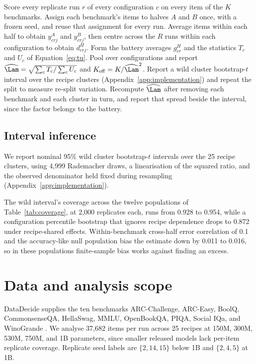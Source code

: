 \begin{algorithm}[t]
\caption{SNAP measurement recipe for a fixed battery of $K$ benchmarks scored on $R$ replicate runs per configuration.}
\label{alg:snap}
\begin{algorithmic}[1]
\STATE Score every replicate run $r$ of every configuration $c$ on every item of the $K$ benchmarks.
\STATE Assign each benchmark's items to halves $A$ and $B$ once, with a frozen seed, and reuse that assignment for every run.
\STATE Average items within each half to obtain $y^A_{crj}$ and $y^B_{crj}$, then centre across the $R$ runs within each configuration to obtain $d^H_{crj}$.
\STATE Form the battery averages $g^H_{cr}$ and the statistics $T_c$ and $U_c$ of Equation~\ref{eq:tu}.
\STATE Pool over configurations and report $\widehat\Lam=\sqrt{\sum_c T_c/\sum_c U_c}$ and $K_{\mathrm{eff}}=K/\widehat\Lam^2$.
\STATE Report a wild cluster bootstrap-$t$ interval over the recipe clusters (Appendix~\ref{app:implementation}) and repeat the split to measure re-split variation.
\STATE Recompute $\widehat\Lam$ after removing each benchmark and each cluster in turn, and report that spread beside the interval, since the factor belongs to the battery.
\end{algorithmic}
\end{algorithm}


\subsection{Interval inference}
We report nominal 95\% wild cluster bootstrap-$t$ intervals over the 25 recipe clusters, using 4,999 Rademacher draws, a linearisation of the squared ratio, and the observed denominator held fixed during resampling (Appendix~\ref{app:implementation}).

The wild interval's coverage across the twelve populations of Table~\ref{tab:coverage}, at 2,000 replicates each, runs from 0.928 to 0.954, while a configuration percentile bootstrap that ignores recipe dependence drops to 0.872 under recipe-shared effects. Within-benchmark cross-half error correlation of 0.1 and the accuracy-like null population bias the estimate down by 0.011 to 0.016, so in these populations finite-sample bias works against finding an excess.

\section{Data and analysis scope}
\label{sec:data}
DataDecide supplies the ten benchmarks ARC-Challenge, ARC-Easy, BoolQ, CommonsenseQA, HellaSwag, MMLU, OpenBookQA, PIQA, Social IQa, and WinoGrande \citep{clark2018arc,clark2019boolq,talmor2019commonsenseqa,zellers2019hellaswag,hendrycks2021mmlu,mihaylov2018openbookqa,bisk2020piqa,sap2019socialiqa,sakaguchi2020winogrande}. We analyse 37,682 items per run across 25 recipes at 150M, 300M, 530M, 750M, and 1B parameters, since smaller released models lack per-item replicate coverage. Replicate seed labels are $\{2,14,15\}$ below 1B and $\{2,4,5\}$ at 1B.

